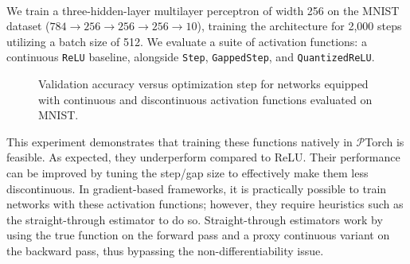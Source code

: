 \begin{tcolorbox}[reprocard, title=Setup]\\
We train a three-hidden-layer multilayer perceptron of width 256 on the MNIST dataset ($784\rightarrow256\rightarrow256\rightarrow256\rightarrow10$), training the architecture for 2,000 steps utilizing a batch size of 512. We evaluate a suite of activation functions: a continuous \texttt{ReLU} baseline, alongside \texttt{Step}, \texttt{GappedStep}, and \texttt{QuantizedReLU}.
\end{tcolorbox}

\begin{figure}[ht]
\centering
{}
\caption{Validation accuracy versus optimization step for networks equipped with continuous and discontinuous activation functions evaluated on MNIST.}
\label{fig:non-diff-activations}
\end{figure}

This experiment demonstrates that training these functions natively in $\mathcal{P}$Torch is feasible. As expected, they underperform compared to ReLU. Their performance can be improved by tuning the step/gap size to effectively make them less discontinuous. In gradient-based frameworks, it is practically possible to train networks with these activation functions; however, they require heuristics such as the straight-through estimator to do so. Straight-through estimators \cite{bengio2013estimating} work by using the true function on the forward pass and a proxy continuous variant on the backward pass, thus bypassing the non-differentiability issue.